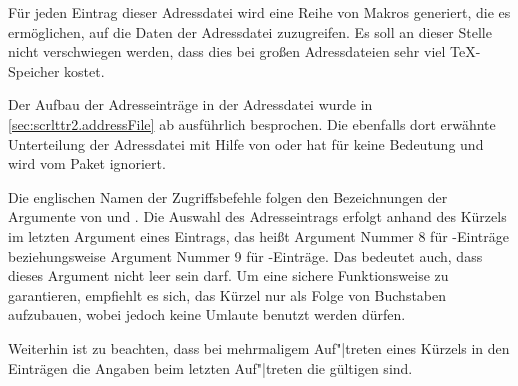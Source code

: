 Für jeden Eintrag dieser Adressdatei wird eine Reihe von Makros generiert,
die es ermöglichen, auf die Daten der Adressdatei zuzugreifen. Es soll an
dieser Stelle nicht verschwiegen werden, dass dies bei großen Adressdateien
sehr viel \TeX-Speicher kostet.
%
\EndIndexGroup

\begin{Declaration}%
\end{Declaration}%
Der Aufbau der Adresseinträge in der Adressdatei wurde in
\autoref{sec:scrlttr2.addressFile} ab
 ausführlich besprochen. Die
ebenfalls dort erwähnte Unterteilung der Adressdatei mit Hilfe von
 oder  hat für  keine
Bedeutung und wird vom Paket ignoriert.%
\EndIndexGroup

\begin{Declaration}
\end{Declaration}%
Die englischen Namen der Zugriffsbefehle folgen den Bezeichnungen der
Argumente von  und
.  Die Auswahl des Adresseintrags erfolgt
anhand des Kürzels im letzten Argument eines Eintrags, das heißt Argument
Nummer 8 für -Einträge beziehungsweise
Argument Nummer 9 für -Einträge. Das
bedeutet auch, dass dieses Argument nicht leer sein darf.  Um eine sichere
Funktionsweise zu garantieren, empfiehlt es sich, das Kürzel nur als Folge von
Buchstaben aufzubauen, wobei jedoch keine Umlaute benutzt werden dürfen.

Weiterhin ist zu beachten, dass bei mehrmaligem Auf"|treten
eines Kürzels in den Einträgen die Angaben beim
letzten Auf"|treten die gültigen sind.%
%
\EndIndexGroup


